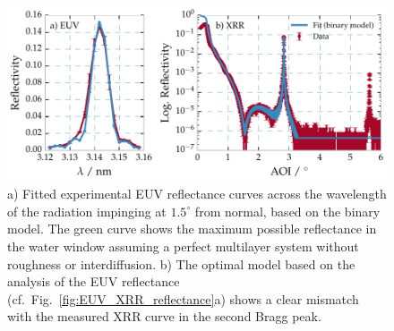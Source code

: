 \begin{figure}[htbp]
  \centering
  \includegraphics[width=\textwidth]{img/CrSc_binary_model_EUV_vs_XRR}
  \caption{a) Fitted experimental EUV reflectance curves across the wavelength 
of the radiation impinging at $1.5^\circ$ from normal, based on the binary 
model. The green curve shows the maximum possible reflectance in the water 
window assuming a perfect multilayer system without roughness or 
interdiffusion. b) The optimal model based on the analysis of the EUV 
reflectance (cf.~Fig.~\ref{fig:EUV_XRR_reflectance}a) shows a clear mismatch 
with the measured XRR curve in the second Bragg peak.
}
  \label{ch_spec:fig_CrSc_binary_model_EUV_vs_XRR}
\end{figure}

